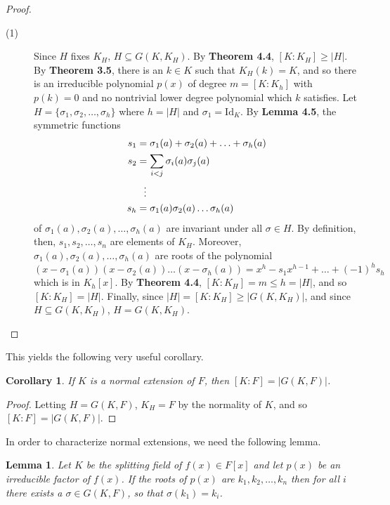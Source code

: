 \documentclass[12pt,leqno]{article}
\numberwithin{equation}{section}
\theoremstyle{plain}
\newtheorem{lem}[thm]{Lemma}
\newtheorem{cor}[thm]{Corollary}
\theoremstyle{definition}
\theoremstyle{remark}
\begin{document}
\begin{proof}
 \begin{description}
  \item [(1)] Since $H$ fixes $K_H$, $H\subseteq G(K,K_H)$. By \textbf{Theorem 4.4}, $[K:K_H]\geq |H|$. By \textbf{Theorem 3.5}, there is an $k\in K$ such that $K_H(k)=K$, and so there is an irreducible polynomial $p(x)$ of degree $m=[K:K_h]$ with $p(k)=0$ and no nontrivial lower degree polynomial which $k$ satisfies. Let $H=\{\sigma_1,\sigma_2,\hdots,\sigma_h\}$ where $h=|H|$ and $\sigma_1=\text{Id}_K$. By \textbf{Lemma 4.5}, the symmetric functions \begin{align*}s_1&=\sigma_1(a)+\sigma_2(a)+\hdots+\sigma_h(a)\\s_2&=\sum_{i<j}\sigma_i(a)\sigma_j(a)\\&\hskip.1in\vdots\\s_h&=\sigma_1(a)\sigma_2(a)\hdots\sigma_h(a)\end{align*} of $\sigma_1(a),\sigma_2(a),\hdots,\sigma_h(a)$ are invariant under all $\sigma\in H$. By definition, then, $s_1,s_2,\hdots,s_n$ are elements of $K_H$. Moreover, $\sigma_1(a),\sigma_2(a),\hdots,\sigma_h(a)$ are roots of the polynomial \[(x-\sigma_1(a))(x-\sigma_2(a))\hdots(x-\sigma_h(a))=x^h-s_1x^{h-1}+\hdots+(-1)^hs_h\] which is in $K_h[x]$. By \textbf{Theorem 4.4}, $[K:K_H]=m\leq h=|H|$, and so $[K:K_H]=|H|$. Finally, since $|H|=[K:K_H]\geq|G(K,K_H)|$, and since $H\subseteq G(K,K_H)$, $H=G(K,K_H)$. \qedhere
 \end{description}
\end{proof}

This yields the following very useful corollary.

\begin{cor}
 If $K$ is a normal extension of $F$, then $[K:F]=|G(K,F)|$.
\end{cor}

\begin{proof}
 Letting $H=G(K,F)$, $K_H=F$ by the normality of $K$, and so $[K:F]=|G(K,F)|$.
\end{proof}

In order to characterize normal extensions, we need the following lemma.

\begin{lem}
 Let $K$ be the splitting field of $f(x)\in F[x]$ and let $p(x)$ be an irreducible factor of $f(x)$. If the roots of $p(x)$ are $k_1,k_2,\hdots,k_n$ then for all $i$ there exists a $\sigma\in G(K,F)$, so that $\sigma(k_1)=k_i$.
\end{lem}
\end{document}
